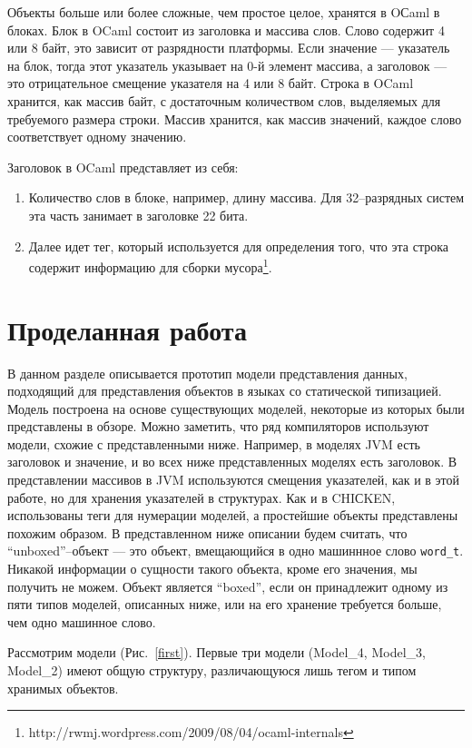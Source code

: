 Объекты больше или более сложные, чем простое целое, хранятся в OСaml в блоках.
Блок в OCaml состоит из заголовка и массива слов. Слово содержит 4 или 8 байт, это зависит от разрядности платформы.
Если значение --- указатель на блок, тогда этот указатель указывает на 0-й элемент массива, а
заголовок --- это отрицательное смещение указателя на 4 или 8 байт.
Строка в OCaml хранится, как массив байт,
с достаточным количеством слов, выделяемых для требуемого размера строки.
Массив хранится, как массив значений,
каждое слово соответствует одному значению.

Заголовок в OCaml представляет из себя:
\begin{enumerate}
\item Количество слов в блоке, например, длину массива. Для 32--разрядных систем эта часть занимает в заголовке 22 бита.
\item Далее идет тег, который используется для определения того, что эта строка содержит информацию для сборки мусора\footnote{http://rwmj.wordpress.com/2009/08/04/ocaml-internals}.
\end{enumerate}
 
\section {Проделанная работа}

В данном разделе описывается прототип модели представления данных, подходящий для представления объектов в языках со статической типизацией.
Модель построена на основе существующих моделей, некоторые из которых были представлены в обзоре. Можно заметить, что ряд компиляторов используют модели, схожие с 
представленными ниже. Например, в моделях JVM есть заголовок и значение, и во всех ниже представленных моделях есть заголовок. В представлении массивов в JVM 
используются смещения указателей, как и в этой работе, но для хранения указателей в структурах.  Как и в CHIСKEN, использованы теги для нумерации моделей,
а простейшие объекты представлены похожим образом. В представленном ниже описании будем считать, что ``unboxed''--объект --- это объект,
вмещающийся в одно машиннное слово \lstinline{word_t}.  Никакой информации о сущности такого объекта, кроме его значения, мы получить не можем.
Объект является ``boxed'', если он принадлежит одному из пяти типов моделей, описанных ниже, или на его хранение требуется больше,
чем одно машинное слово.

Рассмотрим модели (Рис.~\ref{first}). Первые три модели (Model\_4, Model\_3, Model\_2) имеют общую структуру, различающуюся лишь тегом и типом хранимых объектов.

